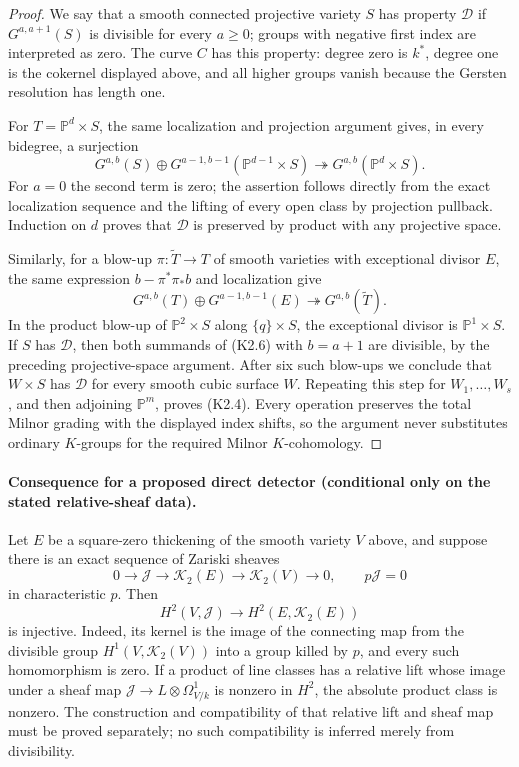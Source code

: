 \begin{proof}
We say that a smooth connected projective variety $S$ has property
$\mathcal D$ if $G^{a,a+1}(S)$ is divisible for every $a\geq0$;
groups with negative first index are interpreted as zero. The curve
$C$ has this property: degree zero is $k^*$, degree one is the
cokernel displayed above, and all higher groups vanish because the
Gersten resolution has length one.

For $T=\mathbb P^d\times S$, the same localization and projection
argument gives, in every bidegree, a surjection
\[
 G^{a,b}(S)\oplus
 G^{a-1,b-1}(\mathbb P^{d-1}\times S)
 \twoheadrightarrow G^{a,b}(\mathbb P^d\times S).
 \tag{K2.5}
\]
For $a=0$ the second term is zero; the assertion follows directly from
the exact localization sequence and the lifting of every open class
by projection pullback. Induction on $d$ proves that $\mathcal D$
is preserved by product with any projective space.

Similarly, for a blow-up $\pi:\widetilde T\to T$ of smooth
varieties with exceptional divisor $E$, the same expression
$b-\pi^*\pi_*b$ and localization give
\[
 G^{a,b}(T)\oplus G^{a-1,b-1}(E)
 \twoheadrightarrow G^{a,b}(\widetilde T).
 \tag{K2.6}
\]
In the product blow-up of $\mathbb P^2\times S$ along
$\{q\}\times S$, the exceptional divisor is $\mathbb P^1\times S$.
If $S$ has $\mathcal D$, then both summands of (K2.6) with
$b=a+1$ are divisible, by the preceding projective-space argument.
After six such blow-ups we conclude that $W\times S$ has
$\mathcal D$ for every smooth cubic surface $W$. Repeating this
step for $W_1,\ldots,W_s$, and then adjoining $\mathbb P^m$, proves
(K2.4). Every operation preserves the total Milnor grading with the
displayed index shifts, so the argument never substitutes ordinary
$K$-groups for the required Milnor $K$-cohomology.
\end{proof}

\paragraph{Consequence for a proposed direct detector
(conditional only on the stated relative-sheaf data).}
Let $E$ be a square-zero thickening of the smooth variety $V$ above,
and suppose there is an exact sequence of Zariski sheaves
\[
 0\longrightarrow\mathcal J\longrightarrow\mathcal K_2(E)
 \longrightarrow\mathcal K_2(V)\longrightarrow0,
 \qquad p\mathcal J=0
\]
in characteristic $p$. Then
\[
 H^2(V,\mathcal J)\longrightarrow H^2(E,\mathcal K_2(E))
\]
is injective. Indeed, its kernel is the image of the connecting map
from the divisible group $H^1(V,\mathcal K_2(V))$ into a group killed
by $p$, and every such homomorphism is zero. If a product of line
classes has a relative lift whose image under a sheaf map
$\mathcal J\to L\otimes\Omega^1_{V/k}$ is nonzero in $H^2$, the
absolute product class is nonzero. The construction and compatibility
of that relative lift and sheaf map must be proved separately; no
such compatibility is inferred merely from divisibility.
